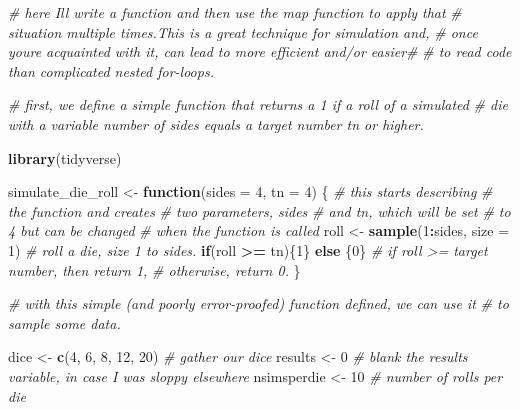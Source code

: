 \documentclass[
]{book}
\newenvironment{Shaded}{\begin{snugshade}}{\end{snugshade}}
\newcommand{\CommentTok}[1]{\textcolor[rgb]{0.56,0.35,0.01}{\textit{#1}}}
\newcommand{\ControlFlowTok}[1]{\textcolor[rgb]{0.13,0.29,0.53}{\textbf{#1}}}
\newcommand{\DataTypeTok}[1]{\textcolor[rgb]{0.13,0.29,0.53}{#1}}
\newcommand{\DecValTok}[1]{\textcolor[rgb]{0.00,0.00,0.81}{#1}}
\newcommand{\KeywordTok}[1]{\textcolor[rgb]{0.13,0.29,0.53}{\textbf{#1}}}
\newcommand{\NormalTok}[1]{#1}
\newcommand{\OperatorTok}[1]{\textcolor[rgb]{0.81,0.36,0.00}{\textbf{#1}}}
\newcommand{\StringTok}[1]{\textcolor[rgb]{0.31,0.60,0.02}{#1}}
\begin{document}
\begin{Shaded}
\begin{Highlighting}[]
\CommentTok{\# here I\textquotesingle{}ll write a function and then use the map function to apply that}
\CommentTok{\# situation multiple times.This is a great technique for simulation and,}
\CommentTok{\# once you\textquotesingle{}re acquainted with it, can lead to more efficient and/or easier\#}
\CommentTok{\# to read code than complicated nested for{-}loops.}

\CommentTok{\# first, we define a simple function that returns a 1 if a roll of a simulated}
\CommentTok{\# die with a variable number of \textquotesingle{}sides\textquotesingle{} equals a target number \textquotesingle{}tn\textquotesingle{} or higher.}

\KeywordTok{library}\NormalTok{(tidyverse)}

\NormalTok{simulate\_die\_roll \textless{}{-}}\StringTok{ }\ControlFlowTok{function}\NormalTok{(}\DataTypeTok{sides =} \DecValTok{4}\NormalTok{, }\DataTypeTok{tn =} \DecValTok{4}\NormalTok{) \{ }\CommentTok{\# this starts describing}
                                                   \CommentTok{\# the function and creates}
                                                   \CommentTok{\# two parameters, sides}
                                                   \CommentTok{\# and tn, which will be set}
                                                   \CommentTok{\# to 4 but can be changed}
                                                   \CommentTok{\# when the function is called}
\NormalTok{  roll \textless{}{-}}\StringTok{ }\KeywordTok{sample}\NormalTok{(}\DecValTok{1}\OperatorTok{:}\NormalTok{sides, }\DataTypeTok{size =} \DecValTok{1}\NormalTok{) }\CommentTok{\# roll a die, size 1 to \textquotesingle{}sides\textquotesingle{}.}
  \ControlFlowTok{if}\NormalTok{(roll }\OperatorTok{\textgreater{}=}\StringTok{ }\NormalTok{tn)\{}\DecValTok{1}\NormalTok{\} }\ControlFlowTok{else}\NormalTok{ \{}\DecValTok{0}\NormalTok{\} }\CommentTok{\# if roll \textgreater{}= target number, then return 1,}
                             \CommentTok{\# otherwise, return 0.}
\NormalTok{\}}

\CommentTok{\# with this simple (and poorly error{-}proofed) function defined, we can use it}
\CommentTok{\# to sample some data.}

\NormalTok{dice \textless{}{-}}\StringTok{ }\KeywordTok{c}\NormalTok{(}\DecValTok{4}\NormalTok{, }\DecValTok{6}\NormalTok{, }\DecValTok{8}\NormalTok{, }\DecValTok{12}\NormalTok{, }\DecValTok{20}\NormalTok{) }\CommentTok{\# gather our dice}
\NormalTok{results \textless{}{-}}\StringTok{ }\DecValTok{0} \CommentTok{\# blank the results variable, in case I was sloppy elsewhere}
\NormalTok{nsimsperdie \textless{}{-}}\StringTok{ }\DecValTok{10} \CommentTok{\# number of rolls per die}


\end{Highlighting}
\end{Shaded}
\end{document}
